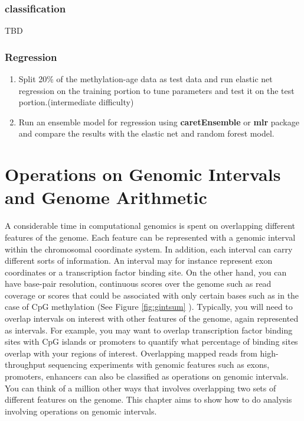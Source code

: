 \documentclass[12pt,]{krantz}
\providecommand{\tightlist}{%
  \setlength{\itemsep}{0pt}\setlength{\parskip}{0pt}}
\begin{document}
\hypertarget{classification}{%
\subsection{classification}\label{classification}}

TBD

\hypertarget{regression}{%
\subsection{Regression}\label{regression}}

\begin{enumerate}
\def\labelenumi{\arabic{enumi}.}
\tightlist
\item
  Split 20\% of the methylation-age data as test data and run elastic net regression on the training portion to tune parameters and test it on the test portion.(intermediate difficulty)
\item
  Run an ensemble model for regression using \textbf{caretEnsemble} or \textbf{mlr} package and compare the results with the elastic net and random forest model.
\end{enumerate}

\hypertarget{genomicIntervals}{%
\chapter{Operations on Genomic Intervals and Genome Arithmetic}\label{genomicIntervals}}

A considerable time in computational genomics is spent on overlapping different
features of the genome. Each feature can be represented with a genomic interval
within the chromosomal coordinate system. In addition, each interval can carry
different sorts of information. An interval may for instance represent exon coordinates or a transcription factor binding site. On the other hand,
you can have base-pair resolution, continuous scores over the genome such as read coverage or
scores that could be associated with only certain bases such as in the case of CpG
methylation (See Figure \ref{fig:gintsum} ).
Typically, you will need to overlap intervals on interest with other features of
the genome, again represented as intervals. For example, you may want to overlap
transcription factor binding sites with CpG islands or promoters to quantify what percentage of binding sites overlap with your regions of interest. Overlapping mapped reads from high-throughput sequencing experiments with genomic features such as exons, promoters, enhancers can also be classified as operations on genomic intervals. You can think of a million other ways that involves overlapping two sets of different features on the genome. This chapter aims to show how to do analysis involving operations on genomic intervals.
\end{document}

